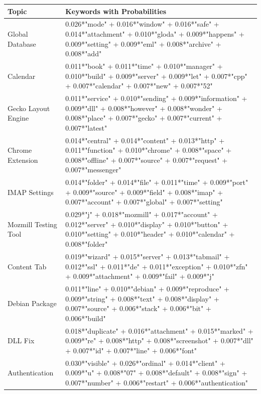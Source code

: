 \documentclass[a4paper,12pt,twoside]{report}
\begin{document}
\begin{table} %
    \centering
    \begin{adjustbox}{max width=\columnwidth}
    \def\arraystretch{1} %
    \begin{tabular}{p{3cm} p{12cm}}
        \toprule
        \textbf{Topic} & \textbf{Keywords with Probabilities}\\
        \midrule
			Global Database & 0.026*"mode" + 0.016*"window" + 0.016*"safe" + 0.014*"attachment" + 0.010*"gloda" + 0.009*"happens" + 0.009*"setting" + 0.009*"eml" + 0.008*"archive" + 0.008*"add" \\
			\midrule 
			Calendar & 0.011*"book" + 0.011*"time" + 0.010*"manager" + 0.010*"build" + 0.009*"server" + 0.009*"let" + 0.007*"cpp" + 0.007*"calendar" + 0.007*"new" + 0.007*"52" \\ 
			\midrule 
			Gecko Layout Engine & 0.011*"service" + 0.010*"sending" + 0.009*"information" + 0.009*"dll" + 0.008*"however" + 0.008*"wonder" + 0.008*"place" + 0.007*"gecko" + 0.007*"current" + 0.007*"latest" \\
			\midrule 
			Chrome Extension & 0.014*"central" + 0.014*"content" + 0.013*"http" + 0.011*"function" + 0.010*"chrome" + 0.008*"space" + 0.008*"offline" + 0.007*"source" + 0.007*"request" + 0.007*"messenger" \\
			\midrule 
			IMAP Settings & 0.014*"folder" + 0.014*"file" + 0.011*"time" + 0.009*"port" + 0.009*"source" + 0.009*"field" + 0.008*"imap" + 0.007*"account" + 0.007*"global" + 0.007*"setting" \\
			\midrule 
			Mozmill Testing Tool & 0.029*"j" + 0.018*"mozmill" + 0.017*"account" + 0.012*"server" + 0.010*"display" + 0.010*"button" + 0.010*"setting" + 0.010*"header" + 0.010*"calendar" + 0.008*"folder" \\
			\midrule 
			Content Tab & 0.019*"wizard" + 0.015*"server" + 0.013*"tabmail" + 0.012*"ssl" + 0.011*"de" + 0.011*"exception" + 0.010*"zfn" + 0.009*"attachment" + 0.009*"fail" + 0.009*"j" \\
			\midrule 
			Debian Package & 0.011*"line" + 0.010*"debian" + 0.009*"reproduce" + 0.009*"string" + 0.008*"text" + 0.008*"display" + 0.007*"source" + 0.006*"stack" + 0.006*"bit" + 0.006*"build" \\
			\midrule 
			DLL Fix & 0.018*"duplicate" + 0.016*"attachment" + 0.015*"marked" + 0.009*"re" + 0.008*"http" + 0.008*"screenshot" + 0.007*"dll" + 0.007*"id" + 0.007*"line" + 0.006*"font" \\
			\midrule 
			Authentication & 0.030*"visible" + 0.026*"ordinal" + 0.014*"client" + 0.009*"u" + 0.008*"07" + 0.008*"default" + 0.008*"sign" + 0.007*"number" + 0.006*"restart" + 0.006*"authentication" \\
        \midrule
    \end{tabular}
    \end{adjustbox}
    \label{tab:tmThunderbird}
\end{table} 
\end{document}
